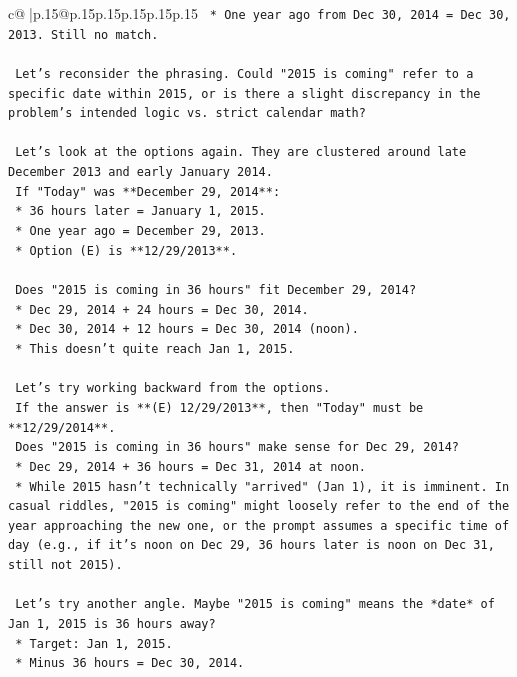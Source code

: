\documentclass{article}
\begin{document}
{\begin{supertabular}{c@{$\;$}|p{.15\linewidth}@{}p{.15\linewidth}p{.15\linewidth}p{.15\linewidth}p{.15\linewidth}p{.15\linewidth}}
{{{\texttt{    *   One year ago from Dec 30, 2014 = Dec 30, 2013. Still no match.} \\
\\ 
\texttt{    Let's reconsider the phrasing. Could "2015 is coming" refer to a specific date within 2015, or is there a slight discrepancy in the problem's intended logic vs. strict calendar math?} \\
\\ 
\texttt{    Let's look at the options again. They are clustered around late December 2013 and early January 2014.} \\
\texttt{    If "Today" was **December 29, 2014**:} \\
\texttt{    *   36 hours later = January 1, 2015.} \\
\texttt{    *   One year ago = December 29, 2013.} \\
\texttt{    *   Option (E) is **12/29/2013**.} \\
\\ 
\texttt{    Does "2015 is coming in 36 hours" fit December 29, 2014?} \\
\texttt{    *   Dec 29, 2014 + 24 hours = Dec 30, 2014.} \\
\texttt{    *   Dec 30, 2014 + 12 hours = Dec 30, 2014 (noon).} \\
\texttt{    *   This doesn't quite reach Jan 1, 2015.} \\
\\ 
\texttt{    Let's try working backward from the options.} \\
\texttt{    If the answer is **(E) 12/29/2013**, then "Today" must be **12/29/2014**.} \\
\texttt{    Does "2015 is coming in 36 hours" make sense for Dec 29, 2014?} \\
\texttt{    *   Dec 29, 2014 + 36 hours = Dec 31, 2014 at noon.} \\
\texttt{    *   While 2015 hasn't technically "arrived" (Jan 1), it is imminent. In casual riddles, "2015 is coming" might loosely refer to the end of the year approaching the new one, or the prompt assumes a specific time of day (e.g., if it's noon on Dec 29, 36 hours later is noon on Dec 31, still not 2015).} \\
\\ 
\texttt{    Let's try another angle. Maybe "2015 is coming" means the *date* of Jan 1, 2015 is 36 hours away?} \\
\texttt{    *   Target: Jan 1, 2015.} \\
\texttt{    *   Minus 36 hours = Dec 30, 2014.} \\
}}}
\end{supertabular}}
\end{document}
